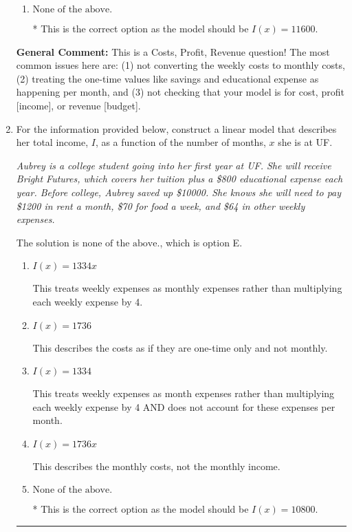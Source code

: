 \documentclass{extbook}[14pt]
\newcommand{\litem}[1]{\item #1

\rule{\textwidth}{0.4pt}}
\begin{document}
\begin{enumerate}
{\begin{enumerate}[label=\Alph*.]
This treats weekly expenses as month expenses rather than multiplying each weekly expense by 4 AND does not account for these expenses per month.
\item \( \text{None of the above.} \)

* This is the correct option as the model should be $I(x) = 11600$.
\end{enumerate}

\textbf{General Comment:} This is a Costs, Profit, Revenue question! The most common issues here are: (1) not converting the weekly costs to monthly costs, (2) treating the one-time values like savings and educational expense as happening per month, and (3) not checking that your model is for cost, profit [income], or revenue [budget].
}
\litem{
For the information provided below, construct a linear model that describes her total income, $I$, as a function of the number of months, $x$ she is at UF.

\begin{center}
    \textit{ Aubrey is a college student going into her first year at UF. She will receive Bright Futures, which covers her tuition plus a \$800 educational expense each year. Before college, Aubrey saved up \$10000. She knows she will need to pay \$1200 in rent a month, \$70 for food a week, and \$64 in other weekly expenses. }
\end{center}


The solution is \( \text{none of the above.} \), which is option E.\begin{enumerate}[label=\Alph*.]
\item \( I(x) = 1334 x \)

This treats weekly expenses as monthly expenses rather than multiplying each weekly expense by 4.
\item \( I(x) = 1736 \)

This describes the costs as if they are one-time only and not monthly.
\item \( I(x) = 1334 \)

This treats weekly expenses as month expenses rather than multiplying each weekly expense by 4 AND does not account for these expenses per month.
\item \( I(x) = 1736 x \)

This describes the monthly costs, not the monthly income.
\item \( \text{None of the above.} \)

* This is the correct option as the model should be $I(x) = 10800$.
\end{enumerate}

}
\end{enumerate}
\end{document}
